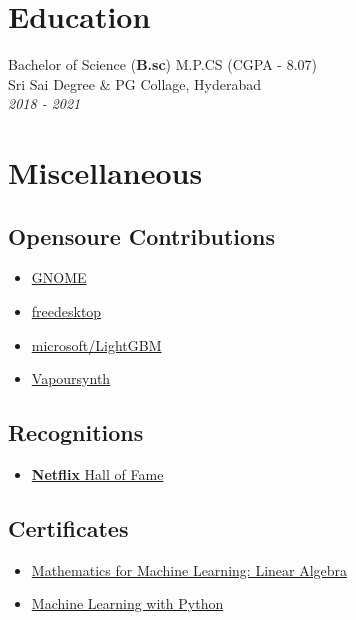 \documentclass{article}
\begin{document}
\section{Education}
Bachelor of Science (\textbf{B.sc}) M.P.CS (CGPA - 8.07) \\
Sri Sai Degree \& PG Collage, Hyderabad \\
\emph{2018 - 2021}


\section{Miscellaneous}


 \subsection{Opensoure Contributions}
 \begin{multicols}{2}
 \begin{itemize}
     \item \href{https://gitlab.gnome.org/jkotra}{GNOME}
     \item \href{https://gitlab.freedesktop.org/jkotra}{freedesktop}
     \item \href{https://github.com/microsoft/LightGBM}{microsoft/LightGBM}
     \item \href{https://github.com/vapoursynth/vapoursynth}{Vapoursynth}
 \end{itemize}
\end{multicols}

\subsection{Recognitions}

\begin{itemize}
    \item \href{https://bugcrowd.com/netflix/hall-of-fame}{\textbf{Netflix} Hall of Fame}
\end{itemize}


\subsection{Certificates}

\begin{itemize}
    \item \href{https://www.coursera.org/account/accomplishments/certificate/E2FE7HNXWP8J}{Mathematics for Machine Learning: Linear Algebra}
    \item \href{https://www.coursera.org/account/accomplishments/certificate/QDPTGAQSXZNM}{Machine Learning with Python}
\end{itemize}
\end{document}
